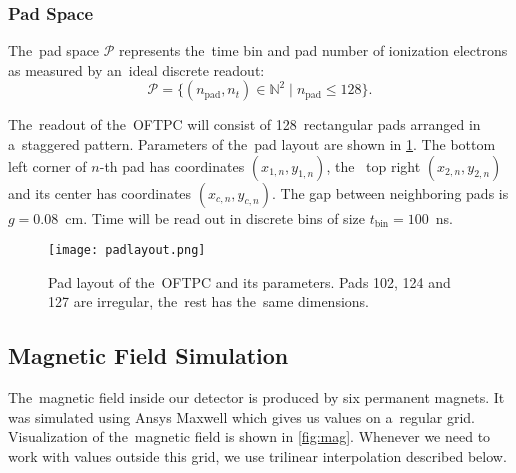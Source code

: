 			
			\subsubsection{Pad Space}
				The~pad space $\mathcal{P}$ represents the~time bin and pad number of ionization electrons as measured by an~ideal discrete readout:
					\begin{equation}
						\mathcal{P} = \{(n_\text{pad},n_t)\in\mathbb{N}^2 \mid n_\text{pad}\leq128\}.
					\end{equation}
				
				The~readout of the~\ac{OFTPC} will consist of 128~rectangular pads arranged in a~staggered pattern. Parameters of the~pad layout are shown in \cref{fig:padlayout}. The bottom left corner of $n$\nobreakdash-th pad has coordinates $(x_{1,n},y_{1,n})$, the~ top right $(x_{2,n},y_{2,n})$ and its center has coordinates $(x_{c,n},y_{c,n})$. The gap between neighboring pads is $g=0.08$~cm. Time will be read out in discrete bins of size $t_\text{bin}=100$~ns.
			
				\begin{figure}[H]
					\centering
					\texttt{[image: padlayout.png]}
					\caption{Pad layout of the~\ac{OFTPC} and its parameters. Pads 102, 124 and 127 are irregular, the~rest has the~same dimensions.}
					\label{fig:padlayout}
				\end{figure}
		
		\subsection{Magnetic Field Simulation}
		\label{sec:mag}
			The~magnetic field inside our detector is produced by six permanent magnets. It was simulated using Ansys Maxwell which gives us values on a~regular grid. Visualization of the~magnetic field is shown in \cref{fig:mag}. Whenever we need to work with values outside this grid, we use trilinear interpolation described below.
			
